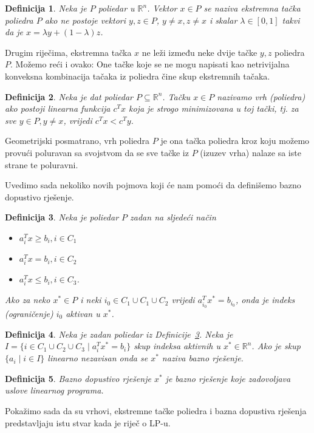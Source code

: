 \documentclass[a4paper, utf8, 11pt, colorlinks]{book}
\newtheorem{definition}{Definicija}
\begin{document}
\begin{definition}
   Neka je $P$ poliedar u $\mathbb{R}^n$.  Vektor $x \in P$ se naziva ekstremna tačka poliedra $P$
   ako ne postoje vektori $y, z \in P$, $y \neq x, z \neq x$ i skalar $\lambda \in [0, 1]$ takvi da je  $x = \lambda y + (1-\lambda)z$.
\end{definition}

 Drugim riječima, ekstremna tačka $x$ ne leži između neke dvije tačke $y,z$    poliedra $P$.
Možemo reći i ovako: One tačke koje se ne mogu napisati kao netrivijalna konveksna kombinacija tačaka iz poliedra čine skup ekstremnih tačaka. 
 
 
\begin{definition}
   Neka je dat poliedar $P \subseteq \mathbb{R}^n$. Tačku $x \in P$ nazivamo vrh (poliedra) ako postoji linearna funkcija  $c^T x$ koja je strogo minimizovana u toj tački, tj. za sve  $y\in P, y \neq x$, vrijedi $c^T x < c^T y$. 
\end{definition}
Geometrijski posmatrano,  vrh poliedra $P$ je ona tačka poliedra  kroz koju možemo provući poluravan sa svojstvom da se sve tačke iz $P$ (izuzev vrha) nalaze sa iste strane te poluravni.

Uvedimo sada nekoliko novih pojmova koji će nam pomoći da definišemo bazno dopustivo rješenje.

\begin{definition}\label{dfn:lp_aktivan}
   Neka je poliedar $P$ zadan na sljedeći način
   \begin{itemize}
       \item $a_i^T x \geq b_i, i \in C_1$
       \item $a_i^T x = b_i, i \in C_2 $
       \item $a_i^T x \leq b_i, i \in C_3 $. 
   \end{itemize}
   Ako za neko $x^* \in P$ i neki $i_0 \in C_1 \cup C_1 \cup C_2$ vrijedi 
   $a_{i_0}^T x^* = b_{i_0}$, onda je indeks (ograničenje) $i_0$ aktivan u $x^*$. 
\end{definition}

\begin{definition}
      Neka je zadan poliedar iz Definicije~\ref{dfn:lp_aktivan}. Neka je 
      $I = \{ i \in C_1 \cup C_2 \cup C_3 \mid a_i^T x^* = b_i \}$  skup indeksa aktivnih u $x^*\in \mathbb{R}^n$.  Ako je skup $\{ a_i \mid i \in I \}$ linearno nezavisan onda se $x^*$  naziva bazno rješenje. 
\end{definition}
\begin{definition}
	 Bazno dopustivo rješenje $x^*$ je bazno rješenje koje zadovoljava  uslove linearnog programa. 
\end{definition}
Pokažimo sada da su vrhovi, ekstremne tačke poliedra i bazna dopustiva rješenja predstavljaju istu stvar kada je riječ o LP-u.
\end{document}
